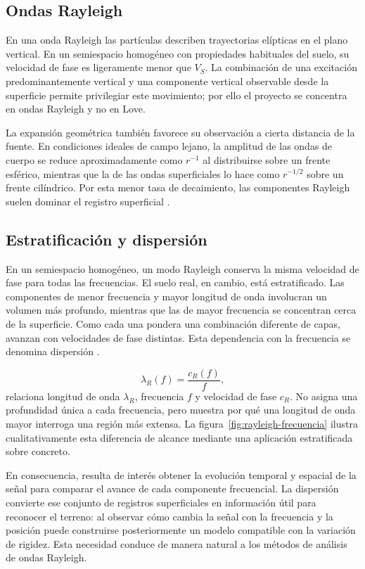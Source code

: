 \subsection{Ondas Rayleigh}
\label{sec:rayleigh}

En una onda Rayleigh las partículas describen trayectorias elípticas en el plano vertical. En un semiespacio homogéneo con propiedades habituales del suelo, su velocidad de fase es ligeramente menor que $V_S$. La combinación de una excitación predominantemente vertical y una componente vertical observable desde la superficie permite privilegiar este movimiento; por ello el proyecto se concentra en ondas Rayleigh y no en Love.

La expansión geométrica también favorece su observación a cierta distancia de la fuente. En condiciones ideales de campo lejano, la amplitud de las ondas de cuerpo se reduce aproximadamente como $r^{-1}$ al distribuirse sobre un frente esférico, mientras que la de las ondas superficiales lo hace como $r^{-1/2}$ sobre un frente cilíndrico. Por esta menor tasa de decaimiento, las componentes Rayleigh suelen dominar el registro superficial \citep{Foti2014}.

\subsection{Estratificación y dispersión}
\label{sec:dispersion}

En un semiespacio homogéneo, un modo Rayleigh conserva la misma velocidad de fase para todas las frecuencias. El suelo real, en cambio, está estratificado. Las componentes de menor frecuencia y mayor longitud de onda involucran un volumen más profundo, mientras que las de mayor frecuencia se concentran cerca de la superficie. Como cada una pondera una combinación diferente de capas, avanzan con velocidades de fase distintas. Esta dependencia con la frecuencia se denomina dispersión \citep{Foti2014,Foti2018}.

\begin{equation}
\lambda_R(f)=\frac{c_R(f)}{f},
\label{eq:longitud-onda}
\end{equation}
relaciona longitud de onda $\lambda_R$, frecuencia $f$ y velocidad de fase $c_R$. No asigna una profundidad única a cada frecuencia, pero muestra por qué una longitud de onda mayor interroga una región más extensa. La figura~\ref{fig:rayleigh-frecuencia} ilustra cualitativamente esta diferencia de alcance mediante una aplicación estratificada sobre concreto.



En consecuencia, resulta de interés obtener la evolución temporal y espacial de la señal para comparar el avance de cada componente frecuencial. La dispersión convierte ese conjunto de registros superficiales en información útil para reconocer el terreno: al observar cómo cambia la señal con la frecuencia y la posición puede construirse posteriormente un modelo compatible con la variación de rigidez. Esta necesidad conduce de manera natural a los métodos de análisis de ondas Rayleigh.
